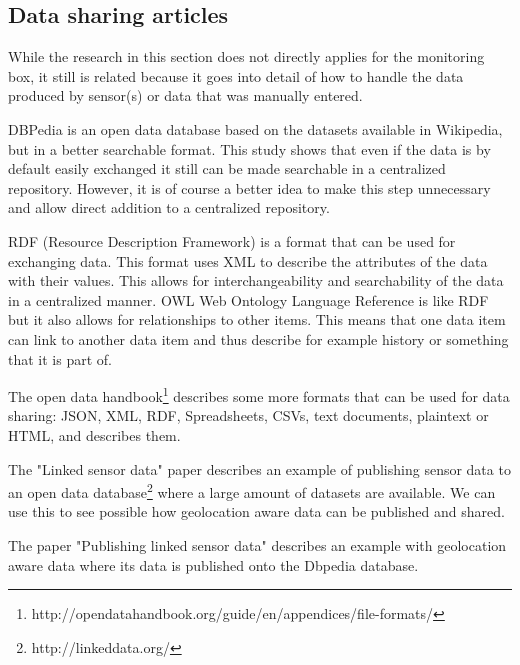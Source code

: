 \documentclass[conference]{IEEEtran}
\begin{document}
\subsection{Data sharing articles}
While the research in this section does not directly applies for the monitoring box, it still is related because it goes into detail of how to handle the data produced by sensor(s) or data that was manually entered.
\par
DBPedia \cite{auer2007dbpedia}  is an open data database based on the datasets available in Wikipedia, but in a better searchable format. This study shows that even if the data is by default easily exchanged it still can be made searchable in a centralized repository. However, it is of course a better idea to make this step unnecessary and allow direct addition to a centralized repository.
\par
RDF (Resource Description Framework) is a format that can be used for exchanging data. \cite{lassila1998resource}  This format uses XML to describe the attributes of the data with their values. This allows for interchangeability and searchability of the data in a centralized manner.
OWL Web Ontology Language Reference \cite{mcguinness2004owl}  is like RDF but it also allows for relationships to other items. This means that one data item can link to another data item and thus describe for example history or something that it is part of.
\par
The open data handbook\footnote{ http://opendatahandbook.org/guide/en/appendices/file-formats/} describes some more formats that can be used for data sharing: JSON, XML, RDF, Spreadsheets, CSVs, text documents, plaintext or HTML, and describes them.
\par
The "Linked sensor data" paper describes an example of publishing sensor data to an open data database\footnote{ http://linkeddata.org/} where a large amount of datasets are available. We can use this to see possible how geolocation aware data can be published and shared.
\par
The paper "Publishing linked sensor data" describes an example with geolocation aware data where its data is published onto the Dbpedia database. \cite{barnaghi2010publishing} 
\end{document}
